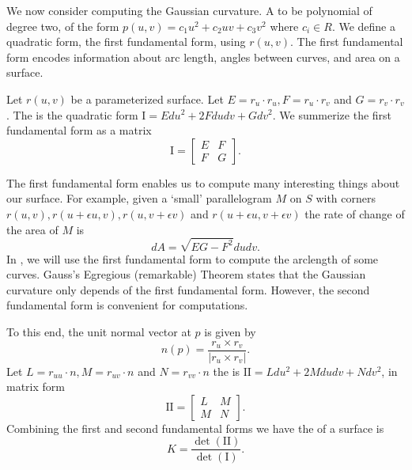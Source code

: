 We now consider computing the Gaussian curvature.
A  to be polynomial of degree two, of the form $p(u,v)=c_1u^2+c_2uv+c_3v^2$ 
where $c_i\in R$.
We define a quadratic form, the first fundamental form, using $r(u,v)$.
The first fundamental form encodes information about arc length, angles between curves,
and area on a surface.

Let $r(u,v)$ be a parameterized surface.
Let $E=r_u\cdot r_u, F=r_u\cdot r_v$ and  $G=r_v\cdot r_v$.
The 
is the quadratic form $\mathrm{I}=Edu^2+2Fdudv +Gdv^2$.
We summerize the first fundamental form as a matrix $$\mathrm{I}=\begin{bmatrix}
E & F \\
F & G 
\end{bmatrix}.$$

The first fundamental form enables us to  compute many interesting
things about our surface.
For example,
given a `small' parallelogram $M$ on $S$ with corners $r(u,v),r(u+\epsilon u, v), r(u,v+\epsilon v)$ 
and $r(u+\epsilon u, v+\epsilon v)$ the rate of change of the area of $M$ is 
$$dA=\sqrt{EG-F^2}dudv.$$
In , we will use the first fundamental form to compute the arclength of some curves.
Gauss's Egregious (remarkable) Theorem states that the Gaussian curvature only depends
of the first fundamental form. However, the second fundamental form is convenient for 
computations.

To this end, the unit normal vector at $p$ is given by $$n(p)=\frac{r_u\times r_v}{|r_u\times r_v|}.$$
Let $L=r_{uu}\cdot n, M=r_{uv}\cdot n$ and $N=r_{vv}\cdot n$ the
 is $\mathrm{I\!I}=Ldu^2+2Mdudv+Ndv^2$,
in matrix form $$\mathrm{I\!I}=\begin{bmatrix}
L & M \\
M & N 
\end{bmatrix}.$$
Combining the first and second fundamental forms we have
the  of a surface is
\begin{equation}\label{eqn:curve-dets}
 	K=\frac{\det(\mathrm{I\!I})}{\det(\mathrm{I})}.
\end{equation}

